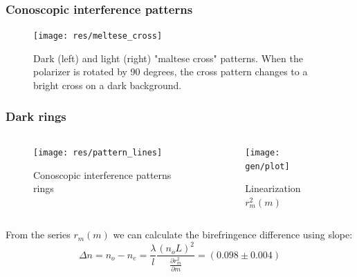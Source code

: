 \documentclass{beamer}
\begin{document}
\begin{frame}
	\frametitle{Conoscopic interference patterns}
	\begin{figure}
		\centering
		\texttt{[image: res/meltese\_cross]}
		\vspace{-10pt}
		\caption{\footnotesize  Dark (left) and light (right) "maltese cross" patterns. When the polarizer is rotated by 90 degrees, the cross pattern changes to a bright cross on a dark background. }
	\end{figure}
\end{frame}

\begin{frame}
	\frametitle{Dark rings}
	\begin{columns}
	\begin{column}{0.5\textwidth}
		\begin{figure}
			\centering
			\texttt{[image: res/pattern\_lines]}
			\caption{\footnotesize Conoscopic interference patterns rings }
		\end{figure}
	\end{column}
	\begin{column}{0.5\textwidth}
		\begin{figure}
			\centering
			\texttt{[image: gen/plot]}
			\caption{\footnotesize Linearization $r_m^2(m)$}
		\end{figure}
	\end{column}
\end{columns}	
\footnotesize
From the series $r_m(m)$ we can calculate the birefringence difference using slope: 
$$\Delta n = n_o - n_e = \frac{\lambda}{l} \frac{(n_o L)^2}{\frac{\partial r^2_m}{\partial m}} = (0.098 \pm 0.004)$$

\end{frame}
\end{document}
